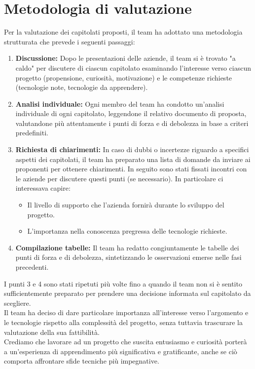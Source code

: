 \documentclass[a4paper,11pt]{article}
\begin{document}
\newpage
\tableofcontents

\newpage
\section{Metodologia di valutazione}
Per la valutazione dei capitolati proposti, il team ha adottato una metodologia strutturata che prevede i seguenti passaggi:
\begin{enumerate}
\item \textbf{Discussione:} Dopo le presentazioni delle aziende, il team si è trovato "a caldo" per discutere di ciascun capitolato esaminando l'interesse verso ciascun progetto (propensione, curiosità, motivazione) e le competenze richieste (tecnologie note, tecnologie da apprendere).
\item \textbf{Analisi individuale:} Ogni membro del team ha condotto un'analisi individuale di ogni capitolato, leggendone il relativo documento di proposta, valutandone più attentamente i punti di forza e di debolezza in base a criteri predefiniti.
\item \textbf{Richiesta di chiarimenti:} In caso di dubbi o incertezze riguardo a specifici aspetti dei capitolati, il team ha preparato una lista di domande da inviare ai proponenti per ottenere chiarimenti. In seguito sono stati fissati incontri con le aziende per discutere questi punti (se necessario).
 In particolare ci interessava capire:
 \begin{itemize}
  \item Il livello di supporto che l'azienda fornirà durante lo sviluppo del progetto.
  \item L'importanza nella conoscenza pregressa delle tecnologie richieste.
 \end{itemize}
\item \textbf{Compilazione tabelle:} Il team ha redatto congiuntamente le tabelle dei punti di forza e di debolezza, sintetizzando le osservazioni emerse nelle fasi precedenti.
\end{enumerate}
I punti 3 e 4 sono stati ripetuti più volte fino a quando il team non si è sentito sufficientemente preparato per prendere una decisione informata sul capitolato da scegliere.\\
Il team ha deciso di dare particolare importanza all'interesse verso l'argomento e le tecnologie rispetto alla complessità del progetto, senza tuttavia trascurare la valutazione della sua fattibilità.\\
Crediamo che lavorare ad un progetto che suscita entusiasmo e curiosità porterà a un'esperienza di apprendimento più significativa e gratificante, anche se ciò comporta affrontare sfide tecniche più impegnative.
\end{document}
